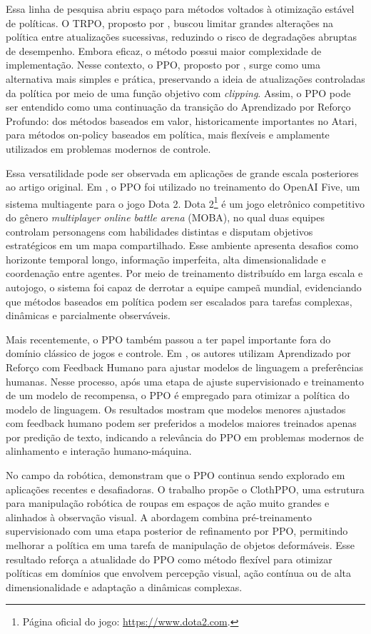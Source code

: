 Essa linha de pesquisa abriu espaço para métodos voltados à otimização estável de políticas. O TRPO, proposto por , buscou limitar grandes alterações na política entre atualizações sucessivas, reduzindo o risco de degradações abruptas de desempenho. Embora eficaz, o método possui maior complexidade de implementação. Nesse contexto, o PPO, proposto por , surge como uma alternativa mais simples e prática, preservando a ideia de atualizações controladas da política por meio de uma função objetivo com \textit{clipping}. Assim, o PPO pode ser entendido como uma continuação da transição do Aprendizado por Reforço Profundo: dos métodos baseados em valor, historicamente importantes no Atari, para métodos on-policy baseados em política, mais flexíveis e amplamente utilizados em problemas modernos de controle.

Essa versatilidade pode ser observada em aplicações de grande escala posteriores ao artigo original. Em , o PPO foi utilizado no treinamento do OpenAI Five, um sistema multiagente para o jogo Dota 2. Dota 2\footnote{Página oficial do jogo: \url{https://www.dota2.com}.} é um jogo eletrônico competitivo do gênero \textit{multiplayer online battle arena} (MOBA), no qual duas equipes controlam personagens com habilidades distintas e disputam objetivos estratégicos em um mapa compartilhado. Esse ambiente apresenta desafios como horizonte temporal longo, informação imperfeita, alta dimensionalidade e coordenação entre agentes. Por meio de treinamento distribuído em larga escala e autojogo, o sistema foi capaz de derrotar a equipe campeã mundial, evidenciando que métodos baseados em política podem ser escalados para tarefas complexas, dinâmicas e parcialmente observáveis.

Mais recentemente, o PPO também passou a ter papel importante fora do domínio clássico de jogos e controle. Em , os autores utilizam Aprendizado por Reforço com Feedback Humano para ajustar modelos de linguagem a preferências humanas. Nesse processo, após uma etapa de ajuste supervisionado e treinamento de um modelo de recompensa, o PPO é empregado para otimizar a política do modelo de linguagem. Os resultados mostram que modelos menores ajustados com feedback humano podem ser preferidos a modelos maiores treinados apenas por predição de texto, indicando a relevância do PPO em problemas modernos de alinhamento e interação humano-máquina.

No campo da robótica,  demonstram que o PPO continua sendo explorado em aplicações recentes e desafiadoras. O trabalho propõe o ClothPPO, uma estrutura para manipulação robótica de roupas em espaços de ação muito grandes e alinhados à observação visual. A abordagem combina pré-treinamento supervisionado com uma etapa posterior de refinamento por PPO, permitindo melhorar a política em uma tarefa de manipulação de objetos deformáveis. Esse resultado reforça a atualidade do PPO como método flexível para otimizar políticas em domínios que envolvem percepção visual, ação contínua ou de alta dimensionalidade e adaptação a dinâmicas complexas.

